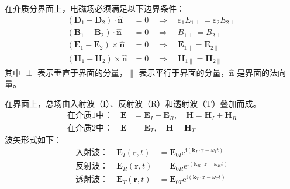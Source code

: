 \documentclass[fontset=none]{ctexart}
\begin{document}
\begin{definition}[边界条件]
在介质分界面上，电磁场必须满足以下边界条件：
\begin{align}
(\bm{D}_1 - \bm{D}_2) \cdot \hat{\bm{n}} &= 0 \quad \Rightarrow \quad \varepsilon_1 E_{1\perp} = \varepsilon_2 E_{2\perp} \\
(\bm{B}_1 - \bm{B}_2) \cdot \hat{\bm{n}} &= 0 \quad \Rightarrow \quad B_{1\perp} = B_{2\perp} \\
(\bm{E}_1 - \bm{E}_2) \times \hat{\bm{n}} &= 0 \quad \Rightarrow \quad \bm{E}_{1\parallel} = \bm{E}_{2\parallel} \\
(\bm{H}_1 - \bm{H}_2) \times \hat{\bm{n}} &= 0 \quad \Rightarrow \quad \bm{H}_{1\parallel} = \bm{H}_{2\parallel}
\end{align}
其中 $\perp$ 表示垂直于界面的分量，$\parallel$ 表示平行于界面的分量，$\hat{\bm{n}}$ 是界面的法向量。
\end{definition}

在界面上，总场由入射波（I）、反射波（R）和透射波（T）叠加而成。
\begin{align}
\text{在介质1中：} \quad \bm{E} &= \bm{E}_I + \bm{E}_R, \quad \bm{H} = \bm{H}_I + \bm{H}_R \\
\text{在介质2中：} \quad \bm{E} &= \bm{E}_T, \quad \bm{H} = \bm{H}_T
\end{align}
波矢形式如下：
\begin{align}
\text{入射波：} \quad \bm{E}_I(\bm{r}, t) &= \bm{E}_{0I} \mathrm{e}^{\mathrm{i}(\bm{k}_I \cdot \bm{r} - \omega_I t)} \\
\text{反射波：} \quad \bm{E}_R(\bm{r}, t) &= \bm{E}_{0R} \mathrm{e}^{\mathrm{i}(\bm{k}_R \cdot \bm{r} - \omega_R t)} \\
\text{透射波：} \quad \bm{E}_T(\bm{r}, t) &= \bm{E}_{0T} \mathrm{e}^{\mathrm{i}(\bm{k}_T \cdot \bm{r} - \omega_T t)}
\end{align}
\end{document}
